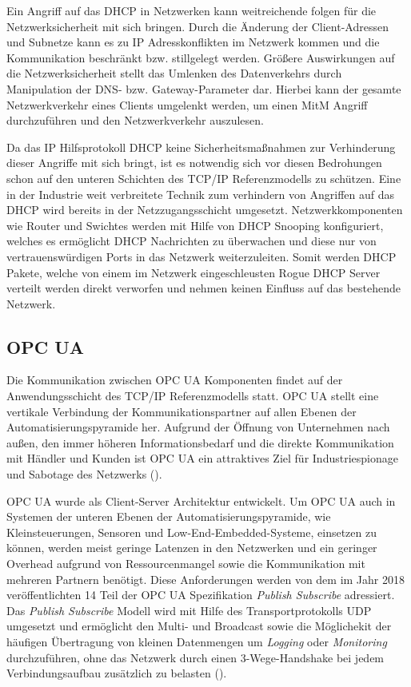 Ein Angriff auf das \ac{DHCP} in Netzwerken kann weitreichende folgen für die Netzwerksicherheit mit sich bringen. Durch die Änderung der Client-Adressen und Subnetze kann es zu \ac{IP} Adresskonflikten im Netzwerk kommen und die Kommunikation beschränkt bzw. stillgelegt werden. Größere Auswirkungen auf die Netzwerksicherheit stellt das Umlenken des Datenverkehrs durch Manipulation der \ac{DNS}- bzw. Gateway-Parameter dar. Hierbei kann der gesamte Netzwerkverkehr eines Clients umgelenkt werden, um einen \ac{MitM} Angriff durchzuführen und den Netzwerkverkehr auszulesen.

Da das \ac{IP} Hilfsprotokoll \ac{DHCP} keine Sicherheitsmaßnahmen zur Verhinderung dieser Angriffe mit sich bringt, ist es notwendig sich vor diesen Bedrohungen schon auf den unteren Schichten des \ac{TCP}/\ac{IP} Referenzmodells zu schützen. Eine in der Industrie weit verbreitete Technik zum verhindern von Angriffen auf das \ac{DHCP} wird bereits in der Netzzugangsschicht umgesetzt. Netzwerkkomponenten wie Router und Swichtes werden mit Hilfe von \ac{DHCP} Snooping konfiguriert, welches es ermöglicht \ac{DHCP} Nachrichten zu überwachen und diese nur von vertrauenswürdigen Ports in das Netzwerk weiterzuleiten. Somit werden \ac{DHCP} Pakete, welche von einem im Netzwerk eingeschleusten Rogue \ac{DHCP} Server verteilt werden direkt verworfen und nehmen keinen Einfluss auf das bestehende Netzwerk.

\subsection{\ac{OPC UA}}
\label{Analyse:OPC UA}
Die Kommunikation zwischen \ac{OPC UA} Komponenten findet auf der Anwendungsschicht des \ac{TCP}/\ac{IP} Referenzmodells statt. \ac{OPC UA} stellt eine vertikale Verbindung der Kommunikationspartner auf allen Ebenen der Automatisierungspyramide her. Aufgrund der Öffnung von Unternehmen nach außen, den immer höheren Informationsbedarf und die direkte Kommunikation mit Händler und Kunden ist \ac{OPC UA} ein attraktives Ziel für Industriespionage und Sabotage des Netzwerks (\cite{opcpt2}). 

\ac{OPC UA} wurde als Client-Server Architektur entwickelt. Um \ac{OPC UA} auch in Systemen der unteren Ebenen der Automatisierungspyramide, wie Kleinsteuerungen, Sensoren und Low-End-Embedded-Systeme, einsetzen zu können, werden meist geringe Latenzen in den Netzwerken und ein geringer Overhead aufgrund von Ressourcenmangel sowie die Kommunikation mit mehreren Partnern benötigt. Diese Anforderungen werden von dem im Jahr 2018 veröffentlichten 14 Teil der \ac{OPC UA} Spezifikation \textit{Publish Subscribe} adressiert. Das \textit{Publish Subscribe} Modell wird mit Hilfe des Transportprotokolls \ac{UDP} umgesetzt und ermöglicht den Multi- und Broadcast sowie die Möglichekit der häufigen Übertragung von kleinen Datenmengen um \textit{Logging} oder \textit{Monitoring} durchzuführen, ohne das Netzwerk durch einen 3-Wege-Handshake bei jedem Verbindungsaufbau zusätzlich zu belasten (\cite{opcpt1}).

